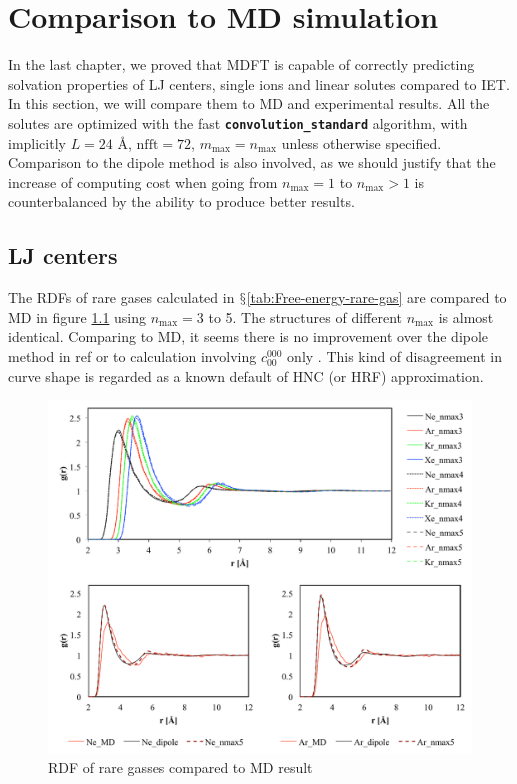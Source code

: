 
\chapter{Comparison to MD simulation\label{chpt:ions}}

In the last chapter, we proved that \acs{MDFT} is capable of
correctly predicting solvation properties of LJ centers, single ions
and linear solutes compared to \acs{IET}. In this section, we will
compare them to \acs{MD} and experimental results. All the solutes
are optimized with the fast \texttt{\textbf{convolution\_standard}}
algorithm, with implicitly $L=24$ $\textrm{Å}$, $\mathrm{nfft}=72$,
$m_{\max}=n_{\max}$ unless otherwise specified. Comparison to the
dipole method is also involved, as we should justify that the increase
of computing cost when going from $n_{\max}=1$ to $n_{\max}>1$ is
counterbalanced by the ability to produce better results. 

\section{LJ centers}

The \acs{RDF}s of rare gases calculated in $\mathsection$\ref{tab:Free-energy-rare-gas}
are compared to \acs{MD} in figure \ref{fig:rare-gazz} using $n_{\max}=3$
to 5. The structures of different $n_{\max}$ is almost identical.
Comparing to \acs{MD}, it seems there is no improvement over the dipole method 
in ref \citep{Zhao_2011} or to calculation involving
$c_{00}^{000}$ only \citep{levesque_scalar_2012}. This kind of disagreement
in curve shape is regarded as a known default of \acs{HNC} (or \acs{HRF})
approximation.

\begin{figure}[h]
\begin{centering}
\includegraphics[width=0.95\columnwidth]{_figure/results/rare_gaz}
\par\end{centering}
\caption{\acs{RDF} of rare gasses compared to \acs{MD} result\label{fig:rare-gazz}}
\end{figure}


